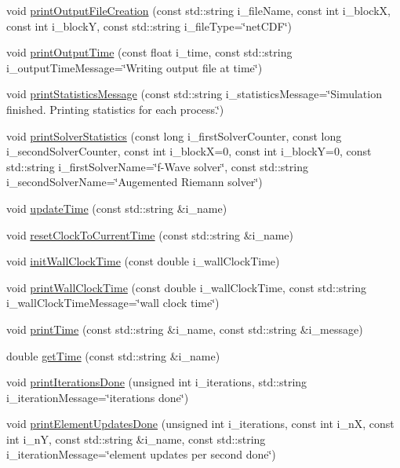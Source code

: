 \begin{DoxyCompactItemize}
\item 
void \hyperlink{classtools_1_1Logger_aec0d76a09748963c9f0b68239e4499c0}{print\-Output\-File\-Creation} (const std\-::string i\-\_\-file\-Name, const int i\-\_\-block\-X, const int i\-\_\-block\-Y, const std\-::string i\-\_\-file\-Type=\char`\"{}net\-C\-D\-F\char`\"{})
\item 
void \hyperlink{classtools_1_1Logger_ab7f380c82631174ff826dfd8bf519058}{print\-Output\-Time} (const float i\-\_\-time, const std\-::string i\-\_\-output\-Time\-Message=\char`\"{}Writing output file at time\char`\"{})
\item 
void \hyperlink{classtools_1_1Logger_a6030321e16a66849dbf237420702a0da}{print\-Statistics\-Message} (const std\-::string i\-\_\-statistics\-Message=\char`\"{}Simulation finished. Printing statistics for each process.\char`\"{})
\item 
void \hyperlink{classtools_1_1Logger_a6f23f0f674d0e7bbf1a52442eff5c031}{print\-Solver\-Statistics} (const long i\-\_\-first\-Solver\-Counter, const long i\-\_\-second\-Solver\-Counter, const int i\-\_\-block\-X=0, const int i\-\_\-block\-Y=0, const std\-::string i\-\_\-first\-Solver\-Name=\char`\"{}f-\/Wave solver\char`\"{}, const std\-::string i\-\_\-second\-Solver\-Name=\char`\"{}Augemented Riemann solver\char`\"{})
\item 
void \hyperlink{classtools_1_1Logger_ad5986d50f6c7bec49b9d07e9b1e7ac1b}{update\-Time} (const std\-::string \&i\-\_\-name)
\item 
void \hyperlink{classtools_1_1Logger_a46e0d98ad67c8ac1d26ff8d695c5fceb}{reset\-Clock\-To\-Current\-Time} (const std\-::string \&i\-\_\-name)
\item 
void \hyperlink{classtools_1_1Logger_ab1bb09a74580560b36c19979d88ef3bc}{init\-Wall\-Clock\-Time} (const double i\-\_\-wall\-Clock\-Time)
\item 
void \hyperlink{classtools_1_1Logger_a432c4dbdbc532bc792cd0d4b30b3b42e}{print\-Wall\-Clock\-Time} (const double i\-\_\-wall\-Clock\-Time, const std\-::string i\-\_\-wall\-Clock\-Time\-Message=\char`\"{}wall clock time\char`\"{})
\item 
void \hyperlink{classtools_1_1Logger_a538f0d1e94f6a957a8936d663f56859c}{print\-Time} (const std\-::string \&i\-\_\-name, const std\-::string \&i\-\_\-message)
\item 
double \hyperlink{classtools_1_1Logger_a01a480f7c6ce911114529b193188f211}{get\-Time} (const std\-::string \&i\-\_\-name)
\item 
void \hyperlink{classtools_1_1Logger_a2e9f836ab40bfde976770aa711b8547d}{print\-Iterations\-Done} (unsigned int i\-\_\-iterations, std\-::string i\-\_\-iteration\-Message=\char`\"{}iterations done\char`\"{})
\item 
void \hyperlink{classtools_1_1Logger_aff8aabe69fd994258cf5238ff0e1f55f}{print\-Element\-Updates\-Done} (unsigned int i\-\_\-iterations, const int i\-\_\-n\-X, const int i\-\_\-n\-Y, const std\-::string \&i\-\_\-name, const std\-::string i\-\_\-iteration\-Message=\char`\"{}element updates per second done\char`\"{})
\end{DoxyCompactItemize}
